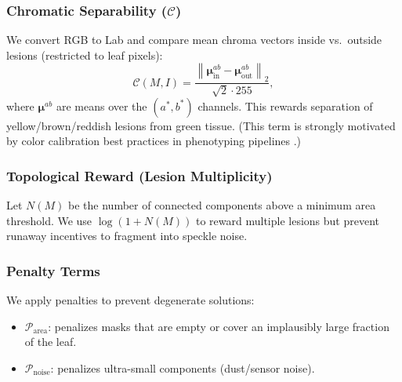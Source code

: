 \documentclass[11pt,a4paper]{article}
\newcommand{\norm}[1]{\left\lVert #1 \right\rVert}
\begin{document}
\subsubsection{Chromatic Separability ($\mathcal{C}$)}
We convert RGB to Lab and compare mean chroma vectors inside vs.\ outside lesions (restricted to leaf pixels):
\begin{equation}
\mathcal{C}(M,I) = \frac{\norm{\bm{\mu}_{\mathrm{in}}^{ab}-\bm{\mu}_{\mathrm{out}}^{ab}}_2}{\sqrt{2}\cdot 255},
\end{equation}
where $\bm{\mu}^{ab}$ are means over the $(a^\ast,b^\ast)$ channels. This rewards separation of yellow/brown/reddish lesions from green tissue. (This term is strongly motivated by color calibration best practices in phenotyping pipelines \citep{berry2018color,plantcv2025}.)

\subsubsection{Topological Reward (Lesion Multiplicity)}
Let $N(M)$ be the number of connected components above a minimum area threshold. We use $\log(1+N(M))$ to reward multiple lesions but prevent runaway incentives to fragment into speckle noise.

\subsubsection{Penalty Terms}
We apply penalties to prevent degenerate solutions:
\begin{itemize}
    \item $\mathcal{P}_{\mathrm{area}}$: penalizes masks that are empty or cover an implausibly large fraction of the leaf.
    \item $\mathcal{P}_{\mathrm{noise}}$: penalizes ultra-small components (dust/sensor noise).
\end{itemize}
\end{document}
